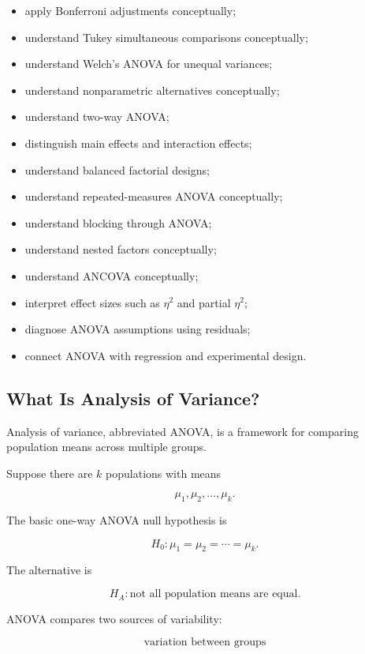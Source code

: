 {\begin{itemize}
    \item apply Bonferroni adjustments conceptually;
    \item understand Tukey simultaneous comparisons conceptually;
    \item understand Welch's ANOVA for unequal variances;
    \item understand nonparametric alternatives conceptually;
    \item understand two-way ANOVA;
    \item distinguish main effects and interaction effects;
    \item understand balanced factorial designs;
    \item understand repeated-measures ANOVA conceptually;
    \item understand blocking through ANOVA;
    \item understand nested factors conceptually;
    \item understand ANCOVA conceptually;
    \item interpret effect sizes such as \(\eta^2\) and partial
          \(\eta^2\);
    \item diagnose ANOVA assumptions using residuals;
    \item connect ANOVA with regression and experimental design.
\end{itemize}
}

\subsection{What Is Analysis of Variance?}
\label{subsec:what-is-anova}

Analysis of variance, abbreviated ANOVA, is a framework for comparing
population means across multiple groups.

Suppose there are \(k\) populations with means

\[
\mu_1,
\mu_2,
\ldots,
\mu_k.
\]

The basic one-way ANOVA null hypothesis is

\[
\boxed{
H_0:
\mu_1=\mu_2=\cdots=\mu_k.
}
\]

The alternative is

\[
\boxed{
H_A:
\text{not all population means are equal}.
}
\]

ANOVA compares two sources of variability:

\[
\boxed{
\text{variation between groups}
}
\]

